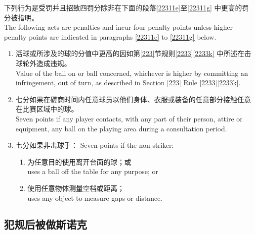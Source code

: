 \noindent 下列行为是受罚并且招致四罚分除非在下面的段落\ref{22311e}至\ref{22311g} 中更高的罚分被指明。\\
The following acts are penalties and incur four penalty points unless higher penalty points are indicated in paragraphs \ref{22311e} to \ref{22311g} below.
\begin{enumerate}[label=(\alph*),start=5]
    \item \label{22311e}活球或所涉及的球的分值中更高的因如第\ref{223}节规则\ref{2233}\ref{2233k} 中所述在击球轮外造成违规。\\
    Value of the ball on or ball concerned, whichever is higher by committing an infringement, out of turn, as described in Section \ref{223} Rule \ref{2233}\ref{2233k}.
    \item 七分如果在磋商时间内任意球员以他们身体、衣服或装备的任意部分接触任意在比赛区域中的球。\\
    Seven points if any player contacts, with any part of their person, attire or equipment, any ball on the playing area during a consultation period.
    \item \label{22311g}七分如果非击球手：
    Seven points if the non-striker:
    \begin{enumerate}[label=(\roman*)]
        \item 为任意目的使用离开台面的球；或\\
        uses a ball off the table for any purpose; or
        \item 使用任意物体测量空档或距离；\\
        uses any object to measure gaps or distance.
    \end{enumerate}
\end{enumerate}

\subsection{犯规后被做斯诺克}\label{22312}

